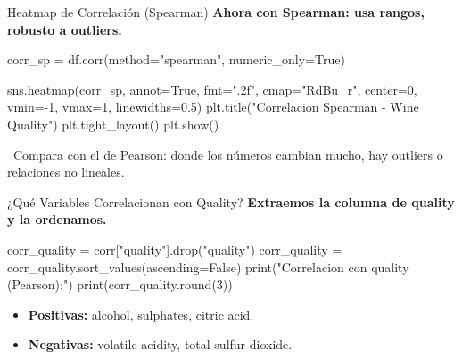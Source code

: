\documentclass[aspectratio=169, 11pt]{beamer}
\begin{document}
\begin{frame}[fragile,shrink=28]{Heatmap de Correlación (Spearman)}
  \vspace{-6pt}
  {\footnotesize\color{arcaDark}\bfseries
    Ahora con Spearman: usa rangos, robusto a outliers.}

  \vspace{4pt}
  \begin{pyblock}
corr_sp = df.corr(method="spearman", numeric_only=True)

sns.heatmap(corr_sp, annot=True, fmt=".2f",
            cmap="RdBu_r", center=0, vmin=-1, vmax=1,
            linewidths=0.5)
plt.title("Correlacion Spearman - Wine Quality")
plt.tight_layout()
plt.show()
  \end{pyblock}

  \vspace{4pt}
  {\scriptsize\color{textMuted}
    \faLightbulb\ Compara con el de Pearson:
    donde los números cambian mucho, hay outliers o relaciones no lineales.}
\end{frame}

\begin{frame}[fragile,shrink=28]{¿Qué Variables Correlacionan con Quality?}
  \vspace{-6pt}
  {\footnotesize\color{arcaDark}\bfseries
    Extraemos la columna de quality y la ordenamos.}

  \vspace{4pt}
  \begin{pyblock}
corr_quality = corr["quality"].drop("quality")
corr_quality = corr_quality.sort_values(ascending=False)
print("Correlacion con quality (Pearson):")
print(corr_quality.round(3))
  \end{pyblock}

  \vspace{4pt}
  {\scriptsize\color{textMuted}
  \begin{itemize}\setlength{\itemsep}{3pt}
    \item[{\color{codeGreen}\scriptsize\faArrowRight}]
      \textbf{Positivas:} alcohol, sulphates, citric acid.
    \item[{\color{arcaRed}\scriptsize\faArrowRight}]
      \textbf{Negativas:} volatile acidity, total sulfur dioxide.
  \end{itemize}
  }
\end{frame}
\end{document}
